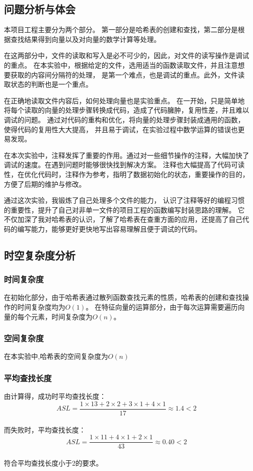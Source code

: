 \subsection{问题分析与体会}\label{subsec:analysis}
{{本项目工程主要分为两个部分。
第一部分是哈希表的创建和查找，第二部分是根据查找结果得到向量以及对向量的数学计算等处理。}}

{在这两部分中，文件的读取和写入是必不可少的，因此，对文件的读写操作是调试的重点。
在本实验中，根据给定的文件，选用适当的函数读取文件，并且注意想要获取的内容间分隔符的处理，
是第一个难点，也是调试的重点。此外，文件读取状态的判断也是一个重点。}

{{在正确地读取文件内容后，如何处理向量也是实验重点。
在一开始，只是简单地将每个读取的向量的处理步骤转换成代码，造成了代码臃肿，复用性差，并且难以调试的问题。
通过对代码的重构和优化，将向量的处理步骤封装成通用的函数，使得代码的复用性大大提高，
并且易于调试，在实验过程中数学运算的错误也更易发现。}}

{{在本次实验中，注释发挥了重要的作用。通过对一些细节操作的注释，大幅加快了调试的速度。在遇到问题时能够很快找到解决方案。
注释也大幅提高了代码可读性，在优化代码时，注释作为参考，指明了数据初始化的状态，重要操作的目的，方便了后期的维护与修改。}}

{{通过这次实验，我锻炼了自己处理多个文件的能力，
认识了注释等好的编程习惯的重要性，提升了自己对非单一文件的项目工程的函数编写封装思路的理解。
它不仅加深了我对哈希表的认识，了解了哈希表在查重方面的应用，还提高了自己代码的编写能力，能够更好更快地写出容易理解且便于调试的代码。}}

\subsection{时空复杂度分析}\label{subsec:analysis2}
\subsubsection{时间复杂度}
{{在初始化部分，由于哈希表通过散列函数查找元素的性质，哈希表的创建和查找操作的时间复杂度均为$O(1)$。
在特征向量的运算部分，由于每次运算需要遍历向量的每个元素，时间复杂度为$O(n)$。}}

\subsubsection{空间复杂度}
{{在本实验中,哈希表的空间复杂度为$O(n)$}}

\subsubsection{平均查找长度}
{{由计算得，成功时平均查找长度：}}
\begin{equation}
	ASL=\frac{1\times13+2\times2+3\times1+4\times1}{17}\approx1.4<2\label{eq:equation2}
\end{equation}\\
{{而失败时，平均查找长度：}}
\begin{equation}
	ASL=\frac{1\times11+4\times1+2\times1}{43}\approx0.40<2\label{eq:equation3}
\end{equation}\\
{{符合平均查找长度小于2的要求。}}
